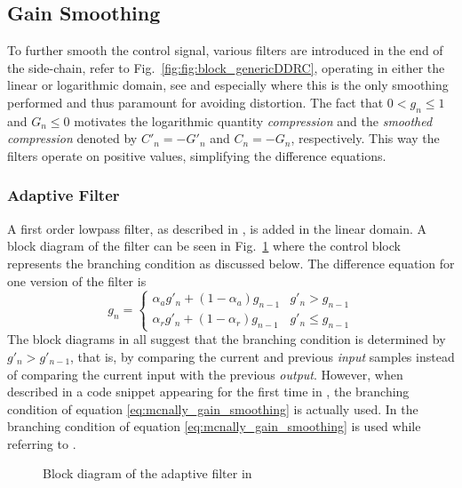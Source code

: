 \documentclass[../main2.tex]{subfiles}
\providecommand{\rootdir}{..}
\begin{document}
\FloatBarrier
\subsection{Gain Smoothing}
To further smooth the control signal, various filters are introduced in the end of the side-chain, refer to Fig.~\ref{fig:fig:block_genericDDRC}, operating in either the linear or logarithmic domain, see \cite{mcnally1984dynamic}\cite{frindle1996implementation} and especially \cite{reiss2012tutorial} where this is the only smoothing performed and thus paramount for avoiding distortion. The fact that $0< g_n\leq 1$ and $G_n \leq 0$ motivates the logarithmic quantity \emph{compression} and the \emph{smoothed compression}  denoted by $C'_n = -G'_n$ and  $C_n = -G_n$, respectively. This way the filters operate on positive values, simplifying the difference equations.
\subsubsection{Adaptive Filter} \label{adaptive_filter}
A first order lowpass filter, as described in \cite{mcnally1984}, is added in the linear domain. A block diagram of the filter can be seen in Fig.~\ref{fig:block_mcnally_theory_adap_filter} where the control block represents the branching condition as discussed below. The difference equation for one version of the filter is
\begin{equation}
g_n = \begin{cases}
    \alpha_{a} g'_n + (1-\alpha_{a}) g_{n-1} 	& g'_n > g_{n-1} \\
    \alpha_{r} g'_n + (1-\alpha_{r}) g_{n-1} 	& g'_n \leq g_{n-1}
\end{cases}
\label{eq:mcnally_gain_smoothing}
\end{equation}
The block diagrams in \cite{mcnally1984dynamic}\cite{dafx02}\cite{dafx11}\cite{zolzer1997digital}\cite{zolzer2008digital} all suggest that the branching condition is determined by $g'_n > g'_{n-1}$, that is, by comparing the current and previous \emph{input} samples instead of comparing the current input with the previous \emph{output}. However, when described in a code snippet appearing for the first time in \cite{dafx11}, the branching condition of equation \eqref{eq:mcnally_gain_smoothing} is actually used. In \cite{bitzer2006parameter} the branching condition of equation \eqref{eq:mcnally_gain_smoothing} is used while referring to \cite{mcnally1984dynamic}\cite{dafx02}.
\begin{figure}
\centerline{}
\caption{Block diagram of the adaptive filter in \cite{mcnally1984dynamic}}
\label{fig:block_mcnally_theory_adap_filter}
\end{figure}
\end{document}
